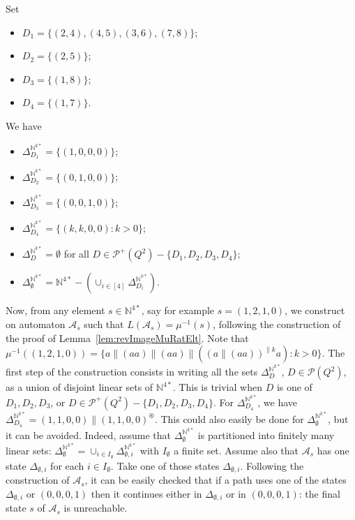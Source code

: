 \documentclass{CSML}
\begin{document}
\begin{exa}
  Set 
  \begin{multicols}{2}
  \begin{itemize}
  \item $D_1=\{(2,4),(4,5),(3,6),(7,8)\}$;
  \item $D_2=\{(2,5)\}$;
  \item $D_3=\{(1,8)\}$;
  \item $D_4=\{(1,7)\}$.
  \end{itemize}
  \end{multicols}
  We have
  \begin{multicols}{2}
  \begin{itemize}
  \item $\Delta_{D_1}^{\mathbb{N}^{k*}}=\{(1,0,0,0)\}$;
  \item $\Delta_{D_2}^{\mathbb{N}^{k*}}=\{(0,1,0,0)\}$;
  \item $\Delta_{D_3}^{\mathbb{N}^{k*}}=\{(0,0,1,0)\}$;
  \item $\Delta_{D_4}^{\mathbb{N}^{k*}}=\{(k,k,0,0) : k>0 \}$;
  \item $\Delta_D^{\mathbb{N}^{k*}}=\emptyset$ for all $D\in\mathcal{P}^+(Q^2)-\{D_1,D_2,D_3,D_4\}$;
  \item $\Delta_\emptyset^{\mathbb{N}^{k*}}=\mathbb{N}^{4*}-(\cup_{i\in[4]}\Delta_{D_i}^{\mathbb{N}^{k*}})$.
  \end{itemize}
  \end{multicols}

  Now, from any element $s\in\mathbb{N}^{4*}$, say for example $s=(1,2,1,0)$, we construct on automaton $\mathcal{A}_s$ such that $L(\mathcal{A}_s)=\mu^{-1}(s)$, following the construction of the proof of Lemma~\ref{lem:revImageMuRatElt}. Note that $\mu^{-1}((1,2,1,0))=\{a\parallel(aa)\parallel(aa)\parallel((a\parallel(aa))^{\parallel k}a) : k>0 \}$. 
  The first step of the construction consists in writing all the sets $\Delta_D^{\mathbb{N}^{k*}}$, $D\in\mathcal{P}(Q^2)$, as a union of disjoint linear sets of $\mathbb{N}^{4*}$. This is trivial when $D$ is one of $D_1,D_2,D_3$, or $D\in\mathcal{P}^+(Q^2)-\{D_1,D_2,D_3,D_4\}$. For $\Delta_{D_4}^{\mathbb{N}^{k*}}$, we have $\Delta_{D_4}^{\mathbb{N}^{k*}}=(1,1,0,0)\parallel (1,1,0,0)^\circledast$. This could also easily be done for $\Delta_\emptyset^{\mathbb{N}^{k*}}$, but it can be avoided. Indeed, assume that $\Delta_\emptyset^{\mathbb{N}^{k*}}$ is partitioned into finitely many linear sets: $\Delta_\emptyset^{\mathbb{N}^{k*}}=\cup_{i\in I_\emptyset}\Delta_{\emptyset,i}^{\mathbb{N}^{k*}}$ with $I_\emptyset$ a finite set.
Assume also that $\mathcal{A}_s$ has one state $\Delta_{\emptyset,i}$ for each $i\in I_\emptyset$. Take one of those states $\Delta_{\emptyset,i}$. 
Following the construction of $\mathcal{A}_s$, it can be easily checked that if a path uses one of the states  $\Delta_{\emptyset,i}$ or $(0,0,0,1)$ then it continues either in $\Delta_{\emptyset,i}$ or in  $(0,0,0,1)$: the final state $s$ of $\mathcal{A}_s$ is unreachable.


\end{exa}
\end{document}
